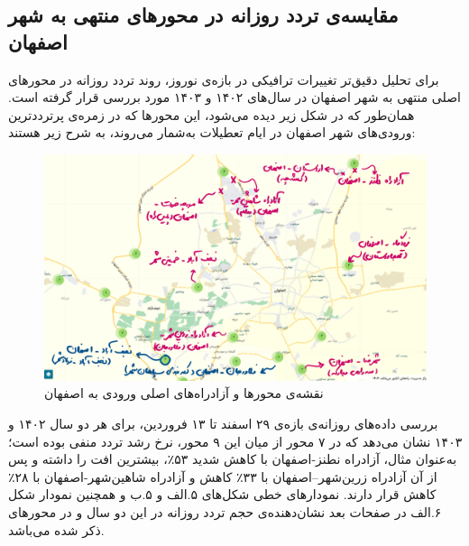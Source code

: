 \documentclass[a4paper, 12pt]{article}
\begin{document}
\subsection{مقایسه‌ی تردد روزانه در محورهای منتهی به شهر اصفهان}
برای تحلیل دقیق‌تر تغییرات ترافیکی در بازه‌ی نوروز، روند تردد روزانه در محورهای اصلی منتهی به شهر اصفهان در سال‌های ۱۴۰۲ و ۱۴۰۳ مورد بررسی قرار گرفته است. همان‌طور که در شکل زیر دیده می‌شود، این محورها که در زمره‌ی پرترددترین ورودی‌های شهر اصفهان در ایام تعطیلات به‌شمار می‌روند، به شرح زیر هستند:
\begin{figure}[htbp]
    \centering
    \includegraphics[width=1\textwidth]{pics/isfahan/isfahan_141.png}
    \caption{نقشه‌ی محورها و آزادراه‌های اصلی ورودی به اصفهان}
\end{figure}

\vspace{2em}
بررسی داده‌های روزانه‌ی بازه‌ی ۲۹ اسفند تا ۱۳ فروردین، برای هر دو سال ۱۴۰۲ و ۱۴۰۳ نشان می‌دهد که در ۷ محور از میان این ۹ محور، نرخ رشد تردد منفی بوده است؛ به‌عنوان مثال، آزادراه نطنز-اصفهان با کاهش شدید ۵۳٪، بیشترین افت را داشته و پس از آن آزادراه زرین‌شهر–اصفهان با ۳۳٪ کاهش و آزادراه شاهین‌شهر-اصفهان با ۲۸٪ کاهش قرار دارند.
نمودارهای خطی شکل‌های ۵.الف و ۵.ب و همچنین نمودار شکل ۶.الف در صفحات بعد نشان‌دهنده‌ی حجم تردد روزانه در این دو سال و در محورهای ذکر شده می‌باشد.
\end{document}
